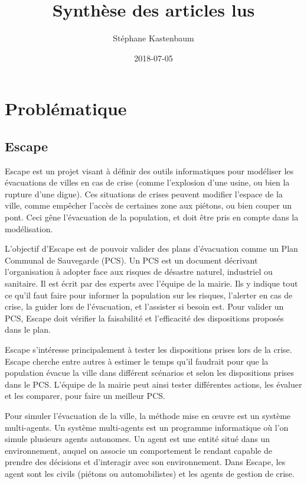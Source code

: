 \documentclass[a4paper]{article}
\title{Synthèse des articles lus}
\author{Stéphane Kastenbaum}
\date{2018-07-05}
\begin{document}
\maketitle

\section{Problématique}

\subsection{Escape}

Escape est un projet visant à définir des outils informatiques pour modéliser
les évacuations de villes en cas de crise (comme l'explosion d'une usine, ou
bien la rupture d'une digue). Ces situations de crises peuvent modifier l'espace
de la ville, comme empêcher l'accès de certaines zone aux piétons, ou bien
couper un pont.  Ceci gêne l'évacuation de la population, et doit être pris en
compte dans la modélisation.

L'objectif d'Escape est de pouvoir valider des plans d'évacuation comme un Plan
Communal de Sauvegarde (PCS). Un PCS est un document décrivant l'organisation à
adopter face aux risques de désastre naturel, industriel ou sanitaire. Il est
écrit par des experts avec l'équipe de la mairie. Ils y indique tout ce qu'il
faut faire pour informer la population sur les risques, l'alerter en cas de
crise, la guider lors de l'évacuation, et l'assister si besoin est. Pour
valider un PCS, Escape doit vérifier la faisabilité et l'efficacité des
dispositions proposés dans le plan.

Escape s'intéresse principalement à tester les dispositions prises lors de la
crise. Escape cherche entre autres à estimer le temps qu'il faudrait pour que la
population évacue la ville dans différent scénarios et selon les dispositions
prises dans le PCS. L'équipe de la mairie peut ainsi tester différentes actions,
les évaluer et les comparer, pour faire un meilleur PCS.

Pour simuler l'évacuation de la ville, la méthode mise en œuvre est un système
multi-agents. Un système multi-agents est un programme informatique où l'on
simule plusieurs agents autonomes. Un agent est une entité situé dans un
environnement, auquel on associe un comportement le rendant capable de prendre
des décisions et d'interagir avec son environnement. Dans Escape, les agent sont
les civils (piétons ou automobilistes) et les agents de gestion de crise.
\end{document}
